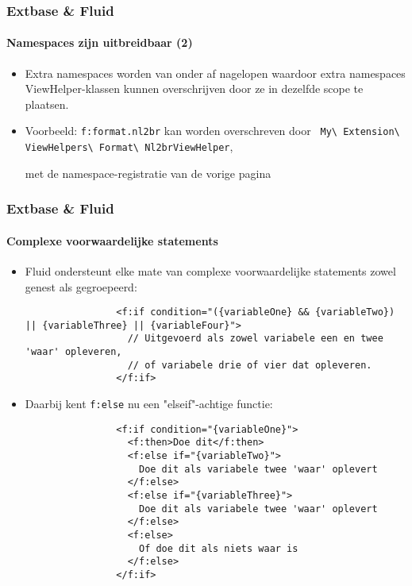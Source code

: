 \begin{frame}[fragile]
	\frametitle{Extbase \& Fluid}
	\framesubtitle{Namespaces zijn uitbreidbaar (2)}

	\begin{itemize}

		\item Extra namespaces worden van onder af nagelopen waardoor extra namespaces ViewHelper-klassen
			kunnen overschrijven door ze in dezelfde scope te plaatsen.

		\item Voorbeeld: \texttt{f:format.nl2br} kan worden overschreven door
			\texttt{
				My\textbackslash
				Extension\textbackslash
				ViewHelpers\textbackslash
				Format\textbackslash
				Nl2brViewHelper},

				met de namespace-registratie van de vorige pagina

	\end{itemize}

\end{frame}



\begin{frame}[fragile]
	\frametitle{Extbase \& Fluid}
	\framesubtitle{Complexe voorwaardelijke statements}

	\lstset{basicstyle=\tiny\ttfamily}

	\begin{itemize}

		\item Fluid ondersteunt elke mate van complexe voorwaardelijke statements zowel
			genest als gegroepeerd:

			\begin{lstlisting}
				<f:if condition="({variableOne} && {variableTwo}) || {variableThree} || {variableFour}">
				  // Uitgevoerd als zowel variabele een en twee 'waar' opleveren,
				  // of variabele drie of vier dat opleveren.
				</f:if>
			\end{lstlisting}

		\item Daarbij kent \texttt{f:else} nu een "elseif"-achtige functie:

			\begin{lstlisting}
				<f:if condition="{variableOne}">
				  <f:then>Doe dit</f:then>
				  <f:else if="{variableTwo}">
				    Doe dit als variabele twee 'waar' oplevert
				  </f:else>
				  <f:else if="{variableThree}">
				    Doe dit als variabele twee 'waar' oplevert
				  </f:else>
				  <f:else>
				    Of doe dit als niets waar is
				  </f:else>
				</f:if>
			\end{lstlisting}

	\end{itemize}

\end{frame}

